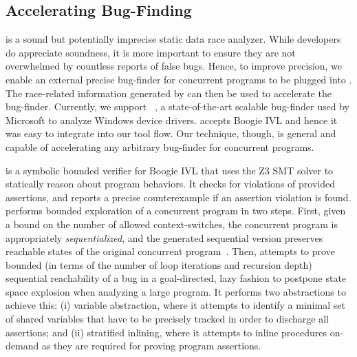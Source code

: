 
\subsection{Accelerating Bug-Finding}
\label{whoop:bugfinding}

\whoop is a sound but potentially imprecise static data race analyzer.  While developers do appreciate soundness, it is more important to ensure they are not overwhelmed by countless reports of false bugs.  Hence, to improve precision, we enable an external precise bug-finder for concurrent programs to be plugged into \whoop. The race-related information generated by \whoop can then be used to accelerate the bug-finder.  Currently, we support \corral~\cite{lal2012corral}, a state-of-the-art scalable bug-finder used by Microsoft to analyze Windows device drivers. \corral accepts Boogie IVL and hence it was easy to integrate into our tool flow. Our technique, though, is general and capable of accelerating any arbitrary bug-finder for concurrent programs.

\corral is a symbolic bounded verifier for Boogie IVL that uses the Z3 SMT solver to statically reason about program behaviors. It checks for violations of provided assertions, and reports a precise counterexample if an assertion violation is found. \corral performs bounded exploration of a concurrent program in two steps. First, given a bound on the number of allowed context-switches, the concurrent program is appropriately \emph{sequentialized}, and the generated sequential version preserves reachable states of the original concurrent program~\cite{popl2011-eqr,cav2009-lqr,cavLalR08}. Then, \corral attempts to prove bounded (in terms of the number of loop iterations and recursion depth) sequential reachability of a bug in a goal-directed, lazy fashion to postpone state space explosion when analyzing a large program. It performs two abstractions to achieve this: (i) variable abstraction, where it attempts to identify a minimal set of shared variables that have to be precisely tracked in order to discharge all assertions; and (ii) stratified inlining, where it attempts to inline procedures on-demand as they are required for proving program assertions.

